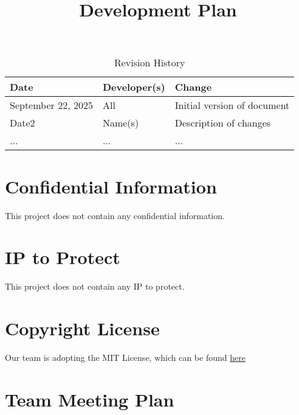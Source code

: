 \documentclass{article}
\title{Development Plan\\\progname}
\author{\authname}
\date{}
\begin{document}
\maketitle

\begin{table}[hp]
\caption{Revision History} \label{TblRevisionHistory}
\begin{tabularx}{\textwidth}{llX}
\toprule
\textbf{Date} & \textbf{Developer(s)} & \textbf{Change}\\
\midrule
September 22, 2025 & All & Initial version of document\\
Date2 & Name(s) & Description of changes\\
... & ... & ...\\
\bottomrule
\end{tabularx}
\end{table}

\newpage{}



\section{Confidential Information}

This project does not contain any confidential information.


\section{IP to Protect}
This project does not contain any IP to protect. 
\section{Copyright License}

Our team is adopting the MIT License, which can be found \href{https://github.com/4G06-CAPSTONE-2025/Reading4All/blob/main/LICENSE} {here}

\section{Team Meeting Plan}
\end{document}
